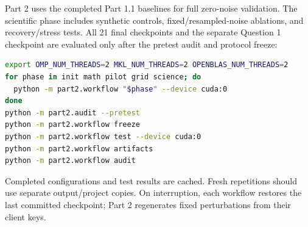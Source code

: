 Part 2 uses the completed Part 1.1 baselines for full zero-noise validation. The scientific phase includes synthetic controls, fixed/resampled-noise ablations, and recovery/stress tests. All 21 final checkpoints and the separate Question 1 checkpoint are evaluated only after the pretest audit and protocol freeze:
\begin{lstlisting}[language=bash]
export OMP_NUM_THREADS=2 MKL_NUM_THREADS=2 OPENBLAS_NUM_THREADS=2
for phase in init math pilot grid science; do
  python -m part2.workflow "$phase" --device cuda:0
done
python -m part2.audit --pretest
python -m part2.workflow freeze
python -m part2.workflow test --device cuda:0
python -m part2.workflow artifacts
python -m part2.workflow audit
\end{lstlisting}
Completed configurations and test results are cached. Fresh repetitions should use separate output/project copies. On interruption, each workflow restores the last committed checkpoint; Part 2 regenerates fixed perturbations from their client keys.
